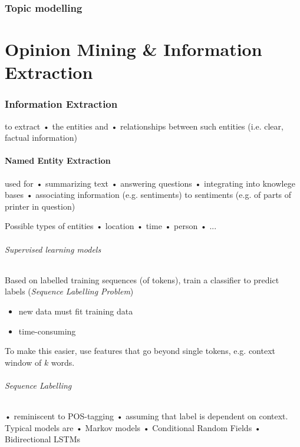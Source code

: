 \documentclass[10pt,twocolumn]{article}
\begin{document}
\section{Topic modelling}




\pagebreak
\part{Opinion Mining \& Information Extraction}

\section{Information Extraction}

to extract  • the entities and  • relationships between such entities (i.e.
clear, factual information)

\subsection{Named Entity Extraction}

used for  • summarizing text  • answering questions  • integrating into knowlege
bases  • associating information (e.g. sentiments) to sentiments (e.g. of parts
of printer in question)

Possible types of entities  • location  • time  • person  • ...

\paragraph{\textit{Supervised learning models}} Based on labelled training
sequences (of tokens), train a classifier to predict labels (\textit{Sequence
  Labelling Problem})
\begin{itemize}
\item new data must fit training data
\item time-consuming
\end{itemize}

To make this easier, use features that go beyond single tokens, e.g. context
window of $k$ words.

\paragraph{\textit{Sequence Labelling}}  • reminiscent to POS-tagging  • assuming
that label is dependent on context. Typical models are  • Markov models  •
Conditional Random Fields  • Bidirectional LSTMs
\end{document}
